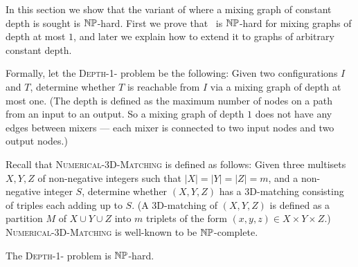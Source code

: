 
%


In this section we show that the variant of {\MixReachability}
where a mixing graph of constant depth is sought is ${\mathbb{NP}}$-hard.
First we prove that \MixReachability~is ${\mathbb{NP}}$-hard for mixing graphs
of depth at most $1$, and later we explain how to extend it to
graphs of arbitrary constant depth.
	
Formally, let the \textsc{Depth-1-\MixReachability} problem be the following: 
Given two configurations $I$ and $T$, determine whether $T$ is reachable from $I$ 
via a mixing graph of depth at most one. (The depth is defined as the maximum
number of nodes on a path from an input to an output. So a mixing graph of depth $1$
does not have any edges between mixers --- each mixer is connected to two input
nodes and two output nodes.)

Recall that \textsc{Numerical-3D-Matching} is defined as follows: 
Given three multisets $X, Y, Z$ of non-negative integers such that $|X| = |Y| = |Z| = m$, 
and a non-negative integer $S$, determine whether $(X,Y,Z)$ 
has a 3D-matching consisting of triples each adding up to $S$.
(A 3D-matching of $(X,Y,Z)$ is defined as a partition $M$ of $X\cup Y\cup Z$
into $m$ triplets of the form $(x,y,z)\in X\times Y \times Z$.)
\textsc{Numerical-3D-Matching} is well-known to be ${\mathbb{NP}}$-complete.


\begin{theorem}
	\label{thm: np-hardness depth 1}
	The \textsc{Depth-1-\MixReachability} problem is ${\mathbb{NP}}$-hard.
\end{theorem}

